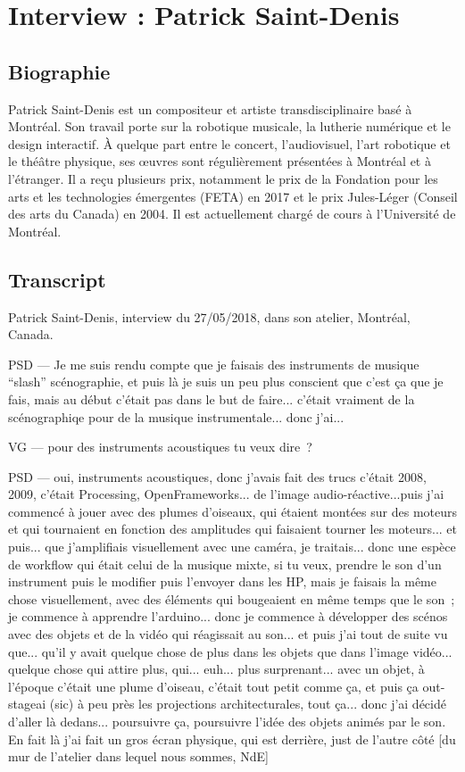 \chapter{Interview : Patrick Saint-Denis}
\label{appendix:saint-denis}

\section*{Biographie}
\noindent Patrick Saint-Denis est un compositeur et artiste transdisciplinaire basé à Montréal. Son travail porte sur la robotique musicale, la lutherie numérique et le design interactif. À quelque part entre le concert, l’audiovisuel, l’art robotique et le théâtre physique, ses œuvres sont régulièrement présentées à Montréal et à l’étranger. Il a reçu plusieurs prix, notamment le prix de la Fondation pour les arts et les technologies émergentes (FETA) en 2017 et le prix Jules-Léger (Conseil des arts du Canada) en 2004. Il est actuellement chargé de cours à l’Université de Montréal.

\section*{Transcript}

Patrick Saint-Denis, interview du 27/05/2018, dans son atelier, Montréal, Canada.

PSD — Je me suis rendu compte que je faisais des instruments de musique ``slash'' scénographie, et puis là je suis un peu plus conscient que c'est ça que je fais, mais au début c'était pas dans le but de faire... c'était vraiment de la scénographiqe pour de la musique instrumentale... donc j'ai...

VG — pour des instruments acoustiques tu veux dire ?

PSD — oui, instruments acoustiques, donc j'avais fait des trucs c'était 2008, 2009, c'était Processing, OpenFrameworks... de l'image audio-réactive...puis j'ai commencé à jouer avec des plumes d'oiseaux, qui étaient montées sur des moteurs et qui tournaient en fonction des amplitudes qui faisaient tourner les moteurs... et puis... que j'amplifiais visuellement avec une caméra, je traitais... donc une espèce de workflow qui était celui de la musique mixte, si tu veux, prendre le son d'un instrument puis le modifier puis l'envoyer dans les HP, mais je faisais la même chose visuellement, avec des éléments qui bougeaient en même temps que le son ; je commence à apprendre l'arduino... donc je commence à développer des scénos avec des objets et de la vidéo qui réagissait au son... et puis j'ai tout de suite vu que... qu'il y avait quelque chose de plus dans les objets que dans l'image vidéo... quelque chose qui attire plus, qui... euh... plus surprenant... avec un objet, à l'époque c'était une plume d'oiseau, c'était tout petit comme ça, et puis ça out-stageai (sic) à peu près les projections architecturales, tout ça... donc j'ai décidé d'aller là dedans... poursuivre ça, poursuivre l'idée des objets animés par le son. En fait là j'ai fait un gros écran physique, qui est derrière, just de l'autre côté [du mur de l'atelier dans lequel nous sommes, NdE] 

